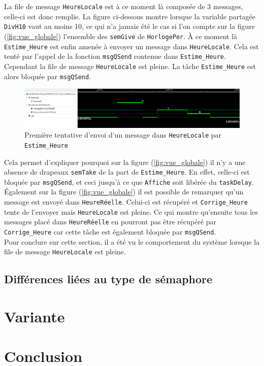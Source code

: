 \documentclass[french]{article}
\begin{document}
	La file de message \texttt{HeureLocale} est à ce moment là composée de 3 messages, celle-ci est donc remplie. La figure ci-dessous montre lorsque la variable partagée \texttt{DivH10} vaut au moins 10, ce qui n'a jamais été le cas si l'on compte sur la figure (\ref{fig:vue_globale}) l'ensemble des \texttt{semGive} de \texttt{HorlogePer}. À ce moment là \texttt{Estime\_Heure} est enfin amenée à envoyer un message dans \texttt{HeureLocale}. Cela est tenté par l'appel de la fonction \texttt{msgQSend} contenue dans \texttt{Estime\_Heure}. Cependant la file de message \texttt{HeureLocale} est pleine. La tâche \texttt{Estime\_Heure} est alors bloquée par \texttt{msgQSend}. 
	
	\begin{figure}[H]
		\centering
		\includegraphics[width=1\linewidth]{../affichage_ralenti/premiere_fois_EstimeHeure_envoi.PNG}
		\caption{Première tentative d'envoi d'un message dans \texttt{HeureLocale} par \texttt{Estime\_Heure}}
		\label{fig:premiere_fois_estime_heure_envoie}
	\end{figure}

	Cela permet d'expliquer pourquoi sur la figure (\ref{fig:vue_globale}) il n'y a une absence de drapeaux \texttt{semTake} de la part de \texttt{Estime\_Heure}. En effet, celle-ci est bloquée par \texttt{msgQSend}, et ceci jusqu'à ce que \texttt{Affiche} soit libérée du \texttt{taskDelay}. Également sur la figure (\ref{fig:vue_globale}) il est possible de remarquer qu'un message est envoyé dans \texttt{HeureRéelle}. Celui-ci est récupéré et \texttt{Corrige\_Heure} tente de l'envoyer mais \texttt{HeureLocale} est pleine. Ce qui montre qu'ensuite tous les messages placé dans \texttt{HeureRéelle} en pourront pas être récupéré par \texttt{Corrige\_Heure} car cette tâche est également bloquée par \texttt{msgQSend}.\\
	
	Pour conclure sur cette section, il a été vu le comportement du système lorsque la file de message \texttt{HeureLocale} est pleine.

	\subsection{Différences liées au type de sémaphore}
	
	\section{Variante}

	\section{Conclusion}

	
\end{document}
